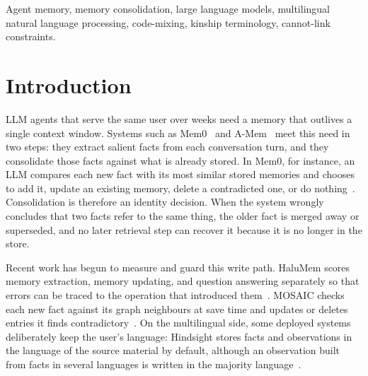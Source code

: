 \documentclass[conference]{IEEEtran}
\begin{document}
\begin{IEEEkeywords}
Agent memory, memory consolidation, large language models, multilingual
natural language processing, code-mixing, kinship terminology, cannot-link
constraints.
\end{IEEEkeywords}

\section{Introduction}

LLM agents that serve the same user over weeks need a memory that outlives
a single context window. Systems such as Mem0~\cite{mem0} and
A-Mem~\cite{amem} meet this need in two steps: they extract salient facts
from each conversation turn, and they consolidate those facts against what
is already stored. In Mem0, for instance, an LLM compares each new fact
with its most similar stored memories and chooses to add it, update an
existing memory, delete a contradicted one, or do nothing~\cite{mem0}.
Consolidation is therefore an identity decision. When the system wrongly
concludes that two facts refer to the same thing, the older fact is
merged away or superseded, and no later retrieval step can recover it
because it is no longer in the store.

Recent work has begun to measure and guard this write path. HaluMem scores
memory extraction, memory updating, and question answering separately so
that errors can be traced to the operation that introduced
them~\cite{halumem}. MOSAIC checks each new fact against its graph
neighbours at save time and updates or deletes entries it finds
contradictory~\cite{mosaic}. On the multilingual side, some deployed
systems deliberately keep the user's language: Hindsight stores facts and
observations in the language of the source material by default, although
an observation built from facts in several languages is written in the
majority language~\cite{hindsight}.
\end{document}
